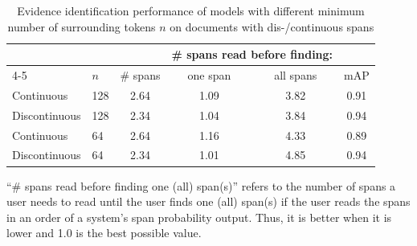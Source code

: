 \begin{table}[t]
    \centering
    \begin{threeparttable}
        \centering
        \fontsize{8pt}{10pt}\selectfont
        \setlength{\tabcolsep}{3pt}
        \renewcommand{\arraystretch}{.6}
        \begin{tabular}{llcccc}\toprule
            & &  & \multicolumn{2}{c}{\# spans read before finding: } & \\\cmidrule(lr){4-5}
            & $n$ & \# spans & one span & all spans &  mAP \\\midrule
            Continuous & 128 & 2.64 & 1.09 & 3.82 & 0.91 \\
            Discontinuous & 128 & 2.34 & 1.04 & 3.84 & 0.94 \\
            \midrule
            Continuous & 64 & 2.64 & 1.16 & 4.33 & 0.89 \\
            Discontinuous & 64 & 2.34 & 1.01 & 4.85 & 0.94 \\
            \bottomrule
        \end{tabular}
        \makeatletter\def\TPT@hsize{}\makeatletter
        \begin{tablenotes}
            \raggedright
            \fontsize{7pt}{7pt}\selectfont
            ``\# spans read before finding one (all) span(s)'' refers to the number of spans a user needs to read until the user finds one (all) span(s) if the user reads the spans in an order of a system's span probability output. Thus, it is better when it is lower and 1.0 is the best possible value.
        \end{tablenotes}
    \end{threeparttable}
    \caption{Evidence identification performance of models with different minimum number of surrounding tokens $n$ on documents with dis-/continuous spans}\label{tab:experiment-discontinous}
\end{table}
